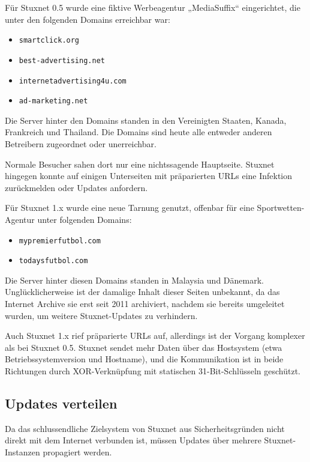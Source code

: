 \documentclass[a4paper]{article}
\begin{document}
Für Stuxnet 0.5 wurde eine fiktive Werbeagentur „MediaSuffix“ eingerichtet, die unter den folgenden Domains erreichbar war:

\begin{itemize}
\item \texttt{smartclick.org}
\item \texttt{best-advertising.net}
\item \texttt{internetadvertising4u.com}
\item \texttt{ad-marketing.net}
\end{itemize}

Die Server hinter den Domains standen in den Vereinigten Staaten, Kanada, Frankreich und Thailand. %
Die Domains sind heute alle entweder anderen Betreibern zugeordnet oder unerreichbar.

Normale Besucher sahen dort nur eine nichtssagende Hauptseite\cite{archive_best_advertising}.
Stuxnet hingegen konnte auf einigen Unterseiten mit präparierten URLs eine Infektion zurückmelden oder Updates anfordern.

Für Stuxnet 1.x wurde eine neue Tarnung genutzt, offenbar für eine Sport\-wet\-ten-Agentur unter folgenden Domains:

\begin{itemize}
\item \texttt{mypremierfutbol.com}
\item \texttt{todaysfutbol.com}
\end{itemize}

Die Server hinter diesen Domains standen in Malaysia und Dänemark.
Un\-glück\-li\-cher\-wei\-se ist der damalige Inhalt dieser Seiten unbekannt,
da das Internet Archive sie erst seit 2011 archiviert,
nachdem sie bereits umgeleitet wurden, um weitere Stuxnet-Updates zu verhindern.

Auch Stuxnet 1.x rief präparierte URLs auf,
allerdings ist der Vorgang komplexer als bei Stuxnet 0.5.
Stuxnet sendet mehr Daten über das Hostsystem (etwa Betriebssystemversion und Hostname),
und die Kommunikation ist in beide Richtungen durch XOR-Verknüpfung mit statischen 31-Bit-Schlüsseln geschützt.

\subsection{Updates verteilen}

Da das schlussendliche Zielsystem von Stuxnet aus Sicherheitsgründen nicht direkt mit dem Internet verbunden ist,
müssen Updates über mehrere Stuxnet-Instanzen propagiert werden.
\end{document}
